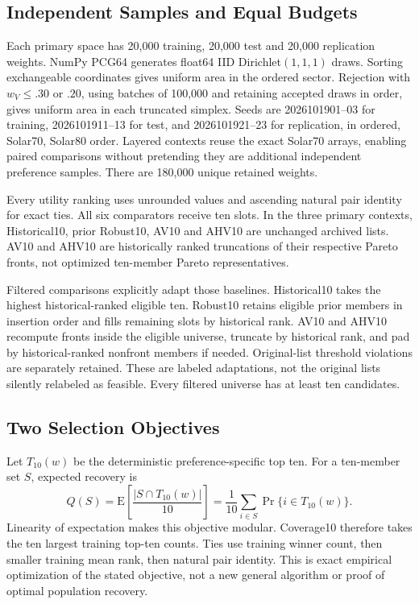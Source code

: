 \documentclass{llncs}
\begin{document}
\subsection{Independent Samples and Equal Budgets}
Each primary space has 20,000 training, 20,000 test and 20,000 replication weights. NumPy PCG64 generates float64 IID Dirichlet$(1,1,1)$ draws. Sorting exchangeable coordinates gives uniform area in the ordered sector. Rejection with $w_V\leq.30$ or $.20$, using batches of 100,000 and retaining accepted draws in order, gives uniform area in each truncated simplex. Seeds are 2026101901--03 for training, 2026101911--13 for test, and 2026101921--23 for replication, in ordered, Solar70, Solar80 order. Layered contexts reuse the exact Solar70 arrays, enabling paired comparisons without pretending they are additional independent preference samples. There are 180,000 unique retained weights.

Every utility ranking uses unrounded values and ascending natural pair identity for exact ties. All six comparators receive ten slots. In the three primary contexts, Historical10, prior Robust10, AV10 and AHV10 are unchanged archived lists. AV10 and AHV10 are historically ranked truncations of their respective Pareto fronts, not optimized ten-member Pareto representatives.

Filtered comparisons explicitly adapt those baselines. Historical10 takes the highest historical-ranked eligible ten. Robust10 retains eligible prior members in insertion order and fills remaining slots by historical rank. AV10 and AHV10 recompute fronts inside the eligible universe, truncate by historical rank, and pad by historical-ranked nonfront members if needed. Original-list threshold violations are separately retained. These are labeled adaptations, not the original lists silently relabeled as feasible. Every filtered universe has at least ten candidates.

\subsection{Two Selection Objectives}
Let $T_{10}(w)$ be the deterministic preference-specific top ten. For a ten-member set $S$, expected recovery is
\begin{equation}
 Q(S)=\mathrm E\left[\frac{|S\cap T_{10}(w)|}{10}\right]
 =\frac1{10}\sum_{i\in S}\Pr\{i\in T_{10}(w)\}.
\end{equation}
Linearity of expectation makes this objective modular. Coverage10 therefore takes the ten largest training top-ten counts. Ties use training winner count, then smaller training mean rank, then natural pair identity. This is exact empirical optimization of the stated objective, not a new general algorithm or proof of optimal population recovery.
\end{document}
